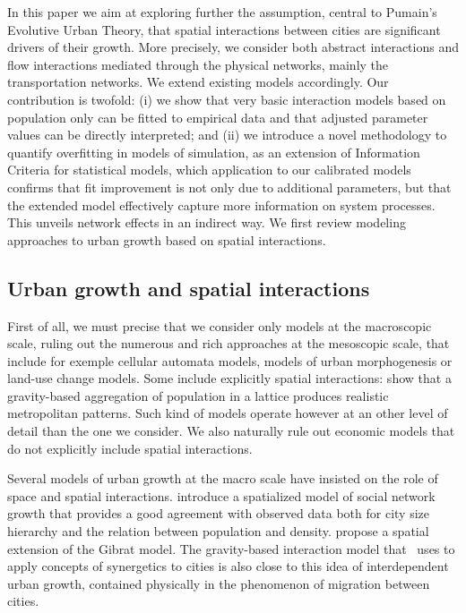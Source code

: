\documentclass{article}
\begin{document}
In this paper we aim at exploring further the assumption, central to Pumain's Evolutive Urban Theory, that spatial interactions between cities are significant drivers of their growth. More precisely, we consider both abstract interactions and flow interactions mediated through the physical networks, mainly the transportation networks. We extend existing models accordingly. Our contribution is twofold: (i) we show that very basic interaction models based on population only can be fitted to empirical data and that adjusted parameter values can be directly interpreted; and (ii) we introduce a novel methodology to quantify overfitting in models of simulation, as an extension of Information Criteria for statistical models, which application to our calibrated models confirms that fit improvement is not only due to additional parameters, but that the extended model effectively capture more information on system processes. This unveils network effects in an indirect way. We first review modeling approaches to urban growth based on spatial interactions.


\subsection*{Urban growth and spatial interactions}

First of all, we must precise that we consider only models at the macroscopic scale, ruling out the numerous and rich approaches at the mesoscopic scale, that include for exemple cellular automata models, models of urban morphogenesis or land-use change models. Some include explicitly spatial interactions: \cite{rybski2013distance} show that a gravity-based aggregation of population in a lattice produces realistic metropolitan patterns. Such kind of models operate however at an other level of detail than the one we consider. We also naturally rule out economic models that do not explicitly include spatial interactions.

Several models of urban growth at the macro scale have insisted on the role of space and spatial interactions. \cite{frasco2014spatially} introduce a spatialized model of social network growth that provides a good agreement with observed data both for city size hierarchy and the relation between population and density. \cite{bretagnolle2000long} propose a spatial extension of the Gibrat model. The gravity-based interaction model that~\cite{sanders1992systeme} uses to apply concepts of synergetics to cities is also close to this idea of interdependent urban growth, contained physically in the phenomenon of migration between cities. 
\end{document}
